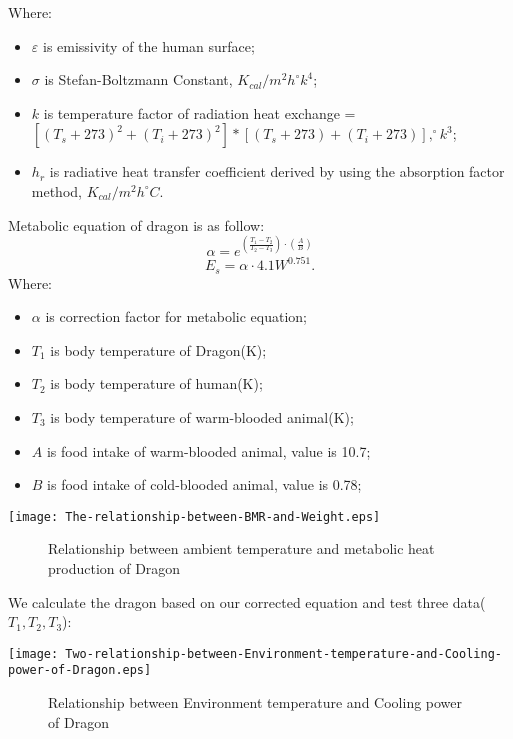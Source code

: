 \documentclass[12pt]{article}
\begin{document}
Where: 
\begin{itemize}
	 \item $\varepsilon$ is emissivity of the human surface;
	 \item $\sigma$ is Stefan-Boltzmann Constant, $K_{cal}/m^2 h ^{\circ}k^4$;
	 \item $k$ is temperature factor of radiation heat exchange = $[(T_s+273)^2+(T_i+273)^2]*[(T_s+273)+(T_i+273)], ^{\circ}k^3$;
	 \item $h_r$ is radiative heat transfer coefficient derived by using the absorption factor method, $K_{cal}/m^2h ^{\circ}C$.
\end{itemize}
Metabolic equation of dragon is as follow:
\begin{equation}
	\alpha = e^{\left(\frac{T_1-T_2}{T_2-T_3}\right)\cdot\left(\frac{A}{B}\right)}
\end{equation}
\begin{equation}
	E_s=\alpha \cdot 4.1W^{0.751}.	%
\end{equation}
Where:
\begin{itemize}
	 \item $\alpha$ is correction factor for metabolic equation;
	 \item $T_1$ is body temperature of Dragon(K);
	 \item $T_2$ is body temperature of human(K);
	 \item $T_3$ is body temperature of warm-blooded animal(K);
	 \item $A$ is food intake of warm-blooded animal, value is 10.7;
	 \item $B$ is food intake of cold-blooded animal, value is 0.78;
\end{itemize}
\centerline{\texttt{[image: The-relationship-between-BMR-and-Weight.eps]}}%
\begin{figure}[!htbp]
    \small
    \caption{Relationship between ambient temperature and metabolic heat production of Dragon}\label{jj}
\end{figure}
We calculate the dragon based on our corrected equation and test three data($T_1,T_2,T_3$):

\centerline{\texttt{[image: Two-relationship-between-Environment-temperature-and-Cooling-power-of-Dragon.eps]}}%
\begin{figure}[!htbp]
    \small
    \caption{Relationship between Environment temperature and Cooling power of Dragon}\label{jj}
\end{figure}
\end{document}
